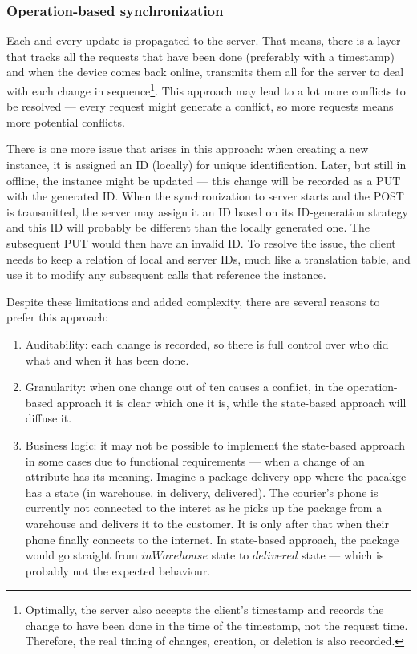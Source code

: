\documentclass[
  digital,     %
  color,       %
  oneside,     %
  nosansbold,  %
  nocolorbold, %
  lof,         %
  lot,         %
]{fithesis4}
\begin{document}
\subsubsection{Operation-based synchronization}
Each and every update is propagated to the server. That means, there is a layer that tracks all the requests that have been done (preferably with a timestamp) and when the device comes back online, transmits them all for the server to deal with each change in sequence\footnote{Optimally, the server also accepts the client's timestamp and records the change to have been done in the time of the timestamp, not the request time. Therefore, the real timing of changes, creation, or deletion is also recorded.}. This approach may lead to a lot more conflicts to be resolved --- every request might generate a conflict, so more requests means more potential conflicts. 

There is one more issue that arises in this approach: when creating a new instance, it is assigned an ID (locally) for unique identification. Later, but still in offline, the instance might be updated --- this change will be recorded as a PUT with the generated ID. When the synchronization to server starts and the POST is transmitted, the server may assign it an ID based on its ID-generation strategy and this ID will probably be different than the locally generated one. The subsequent PUT would then have an invalid ID. To resolve the issue, the client needs to keep a relation of local and server IDs, much like a translation table, and use it to modify any subsequent calls that reference the instance.

Despite these limitations and added complexity, there are several reasons to prefer this approach: 

\begin{enumerate}
  \item Auditability: each change is recorded, so there is full control over who did what and when it has been done.
  \item Granularity: when one change out of ten causes a conflict, in the operation-based approach it is clear which one it is, while the state-based approach will diffuse it.
  \item Business logic: it may not be possible to implement the state-based approach in some cases due to functional requirements --- when a change of an attribute has its meaning. Imagine a package delivery app where the pacakge has a state (in warehouse, in delivery, delivered). The courier's phone is currently not connected to the interet as he picks up the package from a warehouse and delivers it to the customer. It is only after that when their phone finally connects to the internet. In state-based approach, the package would go straight from $inWarehouse$ state to $delivered$ state --- which is probably not the expected behaviour.
\end{enumerate}
  
\end{document}
